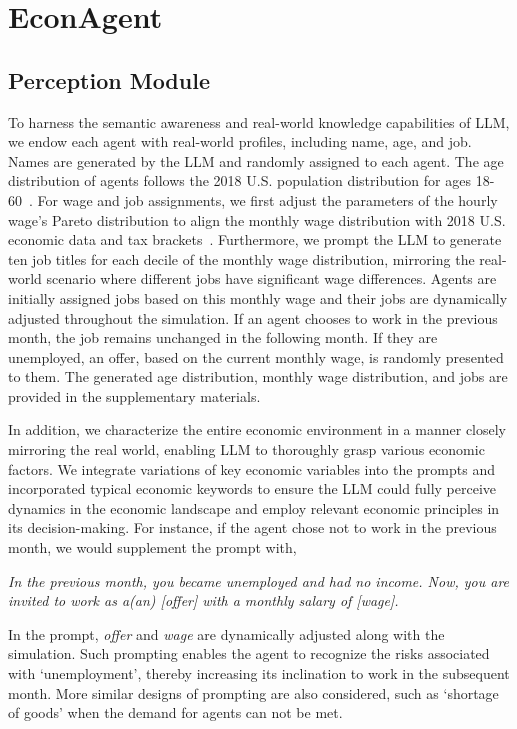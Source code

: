 \section{EconAgent}\label{sec::method}




\subsection{Perception Module}
To harness the semantic awareness and real-world knowledge capabilities of LLM, we endow each agent with real-world profiles, including name, age, and job. Names are generated by the LLM and randomly assigned to each agent. The age distribution of agents follows the 2018 U.S. population distribution for ages 18-60~\cite{bureau_data_nodate}. For wage and job assignments, we first adjust the parameters of the hourly wage's Pareto distribution to align the monthly wage distribution with 2018 U.S. economic data and tax brackets~\cite{zheng2022ai}. Furthermore, we prompt the LLM to generate ten job titles for each decile of the monthly wage distribution, mirroring the real-world scenario where different jobs have significant wage differences. Agents are initially assigned jobs based on this monthly wage and their jobs are dynamically adjusted throughout the simulation. If an agent chooses to work in the previous month, the job remains unchanged in the following month. If they are unemployed, an offer, based on the current monthly wage, is randomly presented to them. The generated age distribution, monthly wage distribution, and jobs are provided in the supplementary materials.

In addition, we characterize the entire economic environment in a manner closely mirroring the real world, enabling LLM to thoroughly grasp various economic factors. We integrate variations of key economic variables into the prompts and incorporated typical economic keywords to ensure the LLM could fully perceive dynamics in the economic landscape and employ relevant economic principles in its decision-making. For instance, if the agent chose not to work in the previous month, we would supplement the prompt with, 

\begin{center}
\begin{minipage}{0.92\linewidth}
    \begin{shaded}
    \textit{In the previous month, you became unemployed and had no income. Now, you are invited to work as a(an) [offer] with a monthly salary of [wage].}
    \end{shaded}
\end{minipage}
\end{center}
In the prompt, \textit{offer} and \textit{wage} are dynamically adjusted along with the simulation. Such prompting enables the agent to recognize the risks associated with `unemployment', thereby increasing its inclination to work in the subsequent month. More similar designs of prompting are also considered, such as `shortage of goods' when the demand for agents can not be met. 

